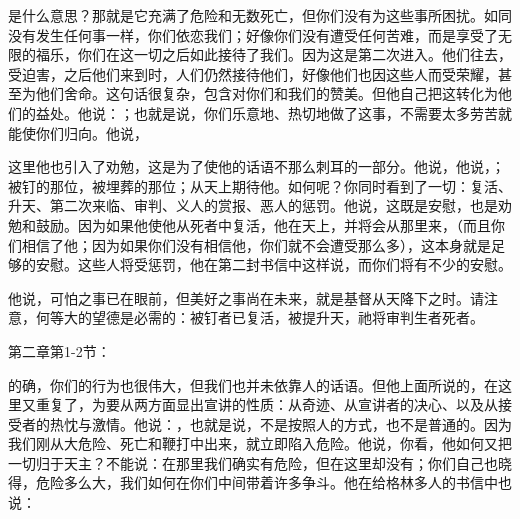 是什么意思？那就是它充满了危险和无数死亡，但你们没有为这些事所困扰。如同没有发生任何事一样，你们依恋我们；好像你们没有遭受任何苦难，而是享受了无限的福乐，你们在这一切之后如此接待了我们。因为这是第二次进入。他们往去，受迫害，之后他们来到时，人们仍然接待他们，好像他们也因这些人而受荣耀，甚至为他们舍命。这句话很复杂，包含对你们和我们的赞美。但他自己把这转化为他们的益处。他说：；也就是说，你们乐意地、热切地做了这事，不需要太多劳苦就能使你们归向。他说，\par

这里他也引入了劝勉，这是为了使他的话语不那么刺耳的一部分。他说，他说，；被钉的那位，被埋葬的那位；从天上期待他。如何呢？你同时看到了一切：复活、升天、第二次来临、审判、义人的赏报、恶人的惩罚。他说，这既是安慰，也是劝勉和鼓励。因为如果他使他从死者中复活，他在天上，并将会从那里来，（而且你们相信了他；因为如果你们没有相信他，你们就不会遭受那么多），这本身就是足够的安慰。这些人将受惩罚，他在第二封书信中这样说，而你们将有不少的安慰。\par

他说，可怕之事已在眼前，但美好之事尚在未来，就是基督从天降下之时。请注意，何等大的望德是必需的：被钉者已复活，被提升天，祂将审判生者死者。\par

第二章第1-2节：\par

的确，你们的行为也很伟大，但我们也并未依靠人的话语。但他上面所说的，在这里又重复了，为要从两方面显出宣讲的性质：从奇迹、从宣讲者的决心、以及从接受者的热忱与激情。他说：，也就是说，不是按照人的方式，也不是普通的。因为我们刚从大危险、死亡和鞭打中出来，就立即陷入危险。他说，你看，他如何又把一切归于天主？不能说：在那里我们确实有危险，但在这里却没有；你们自己也晓得，危险多么大，我们如何在你们中间带着许多争斗。他在给格林多人的书信中也说：\par

